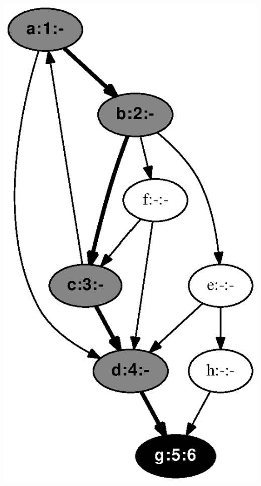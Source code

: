 \documentclass{article}
\begin{document}
\includegraphics[height=.3\textheight]{dfs_directed_classroom_06.eps}
\vspace{1em}
\end{document}

